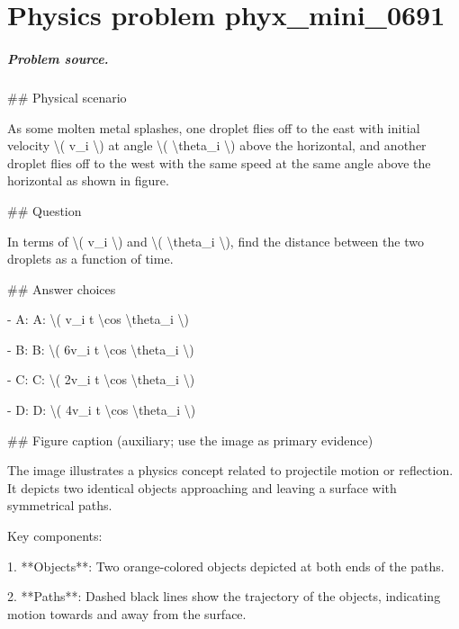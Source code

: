 
\chapter{Physics problem phyx\_mini\_0691}
\label{ch:PhyXMiniProblems_problem_phyx_mini_0691}

\paragraph{Problem source.}
\#\# Physical scenario

As some molten metal splashes, one droplet flies off to the east with initial velocity \textbackslash{}( v\_i \textbackslash{}) at angle \textbackslash{}( \textbackslash{}theta\_i \textbackslash{}) above the horizontal, and another droplet flies off to the west with the same speed at the same angle above the horizontal as shown in figure.

\#\# Question

In terms of \textbackslash{}( v\_i \textbackslash{}) and \textbackslash{}( \textbackslash{}theta\_i \textbackslash{}), find the distance between the two droplets as a function of time.

\#\# Answer choices

- A: A: \textbackslash{}( v\_i t \textbackslash{}cos \textbackslash{}theta\_i \textbackslash{})

- B: B: \textbackslash{}( 6v\_i t \textbackslash{}cos \textbackslash{}theta\_i \textbackslash{})

- C: C: \textbackslash{}( 2v\_i t \textbackslash{}cos \textbackslash{}theta\_i \textbackslash{})

- D: D: \textbackslash{}( 4v\_i t \textbackslash{}cos \textbackslash{}theta\_i \textbackslash{})

\#\# Figure caption (auxiliary; use the image as primary evidence)

The image illustrates a physics concept related to projectile motion or reflection. It depicts two identical objects approaching and leaving a surface with symmetrical paths.

Key components:

1. **Objects**: Two orange-colored objects depicted at both ends of the paths.
   
2. **Paths**: Dashed black lines show the trajectory of the objects, indicating motion towards and away from the surface.

